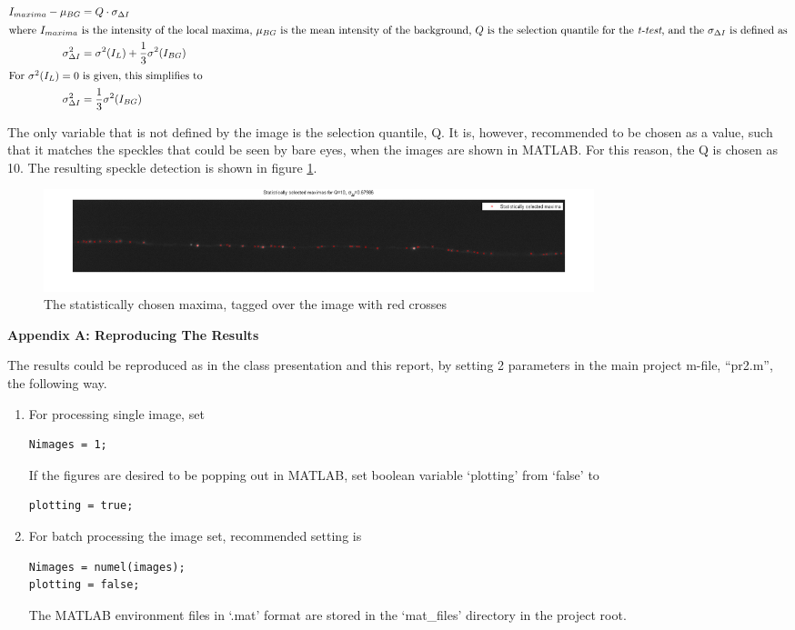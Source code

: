 \documentclass{article}
\begin{document}
\begin{align}
I_{maxima} - \mu_{BG} &= Q\cdot \sigma_{\Delta I}\\
\intertext{where $I_{maxima}$ is the intensity of the local maxima, $\mu_{BG}$ is the mean intensity of the background, $Q$ is the selection quantile for the \emph{t-test}, and the $\sigma_{\Delta I}$ is defined as}
\sigma^2_{\Delta I} &= \sigma^2(I_L) + \frac{1}{3}\sigma^2(I_{BG}) \nonumber \\
\intertext{For $\sigma^2(I_L)=0$ is given, this simplifies to}
\sigma^2_{\Delta I} &= \frac{1}{3}\sigma^2(I_{BG})
\end{align}

The only variable that is not defined by the image is the selection quantile, Q. It is, however, recommended to be chosen as a value, such that it matches the speckles that could be seen by bare eyes, when the images are shown in MATLAB. For this reason, the Q is chosen as 10. The resulting speckle detection is shown in figure \ref{fig:statMax}.

\begin{figure}[h]
\centering
\includegraphics[width=16cm]{figures/statMax.png}
\caption{The statistically chosen maxima, tagged over the image with red crosses}
\label{fig:statMax}
\end{figure}
 
\textbf{Appendix A: Reproducing The Results}
 
The results could be reproduced as in the class presentation and this report, by setting 2 parameters in the main project m-file, ``pr2.m'', the following way.
\begin{enumerate}
\item For processing single image, set
\begin{verbatim}
Nimages = 1;
\end{verbatim}
If the figures are desired to be popping out in MATLAB, set boolean variable `plotting' from `false' to
\begin{verbatim}
plotting = true;
\end{verbatim}
\item For batch processing the image set, recommended setting is
\begin{verbatim}
Nimages = numel(images);
plotting = false;
\end{verbatim}
The MATLAB environment files in `.mat' format are stored in the `mat\_files' directory in the project root.
\end{enumerate}
 
\end{document}
